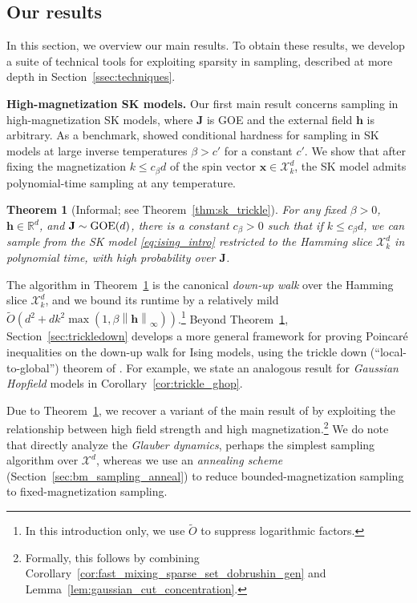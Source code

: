 \documentclass[11pt]{article}
\newtheorem{theorem}{Theorem}
\newcommand{\norm}[1]{\left\lVert#1\right\rVert}
\newcommand{\R}{\mathbb{R}}
\newcommand{\1}{\mathbf{1}}
\newcommand{\0}{\mathbf{0}}
\newcommand{\tO}{\widetilde{O}}
\newcommand{\mj}{{\mathbf{J}}}
\newcommand{\vh}{{\mathbf{h}}}
\newcommand{\vx}{{\mathbf{x}}}
\newcommand{\calX}{{\mathcal{X}}}
\begin{document}
\subsection{Our results}\label{ssec:results}
In this section, we overview our main results. To obtain these results, we
develop a suite of technical tools for exploiting sparsity in sampling, described at more depth in Section~\ref{ssec:techniques}.

\textbf{High-magnetization SK models.} Our first main result concerns sampling in high-magnetization SK models, where $\mj$ is GOE and the external field $\vh$ is arbitrary. As a benchmark, \cite{AlaouiMS22} showed conditional hardness for sampling in SK models at large inverse temperatures $\beta > c'$ for a constant $c'$. We show that after fixing the magnetization $k \le c_\beta d$ of the spin vector $\vx \in \calX^d_k$, the SK model admits polynomial-time sampling at any temperature.

\begin{theorem}[Informal; see Theorem~\ref{thm:sk_trickle}]\label{thm:informal-trickledown}
For any fixed $\beta > 0$, $\vh \in \R^d$, and $\mj \sim \textup{GOE}(d)$, there is a constant $c_\beta > 0$ such that if $k \le c_\beta d$, we can sample from the SK model \eqref{eq:ising_intro} restricted to the Hamming slice $\calX^d_k$ in polynomial time, with high probability over $\mj$.
\end{theorem}

The algorithm in Theorem~\ref{thm:informal-trickledown} is the canonical \emph{down-up walk} over the Hamming slice $\calX^d_k$, and we bound its runtime by a relatively mild $\tO(d^2 + dk^2\max(1, \beta\norm{\vh}_\infty))$.\footnote{In this introduction only, we use $\tO$ to suppress logarithmic factors.} Beyond Theorem~\ref{thm:informal-trickledown}, Section~\ref{sec:trickledown} develops a more general framework for proving Poincar\'e inequalities on the down-up walk for Ising models, using the trickle down (``local-to-global'') theorem of \cite{oppenheim2018local, alev2020improved}. For example, we state an analogous result for \emph{Gaussian Hopfield} models in Corollary~\ref{cor:trickle_ghop}.

Due to Theorem~\ref{thm:informal-trickledown}, we recover a variant of the main result of \cite{BandeiraElAlaouiRodder26} by exploiting the relationship between high field strength and high magnetization.\footnote{Formally, this follows by combining Corollary~\ref{cor:fast_mixing_sparse_set_dobrushin_gen} and Lemma~\ref{lem:gaussian_cut_concentration}.} We do note that \cite{BandeiraElAlaouiRodder26} directly analyze the \emph{Glauber dynamics}, perhaps the simplest sampling algorithm over $\calX^d$, whereas we use an \emph{annealing scheme} (Section~\ref{sec:bm_sampling_anneal}) to reduce bounded-magnetization sampling to fixed-magnetization sampling.
\end{document}
